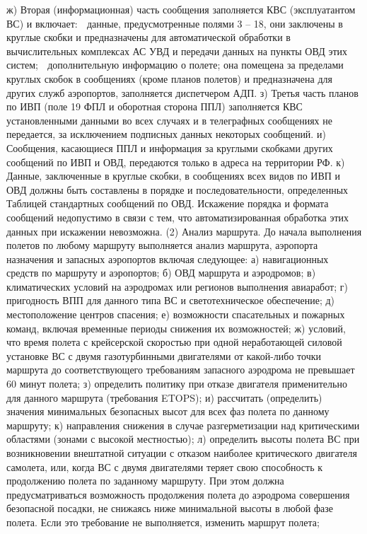 ж)	Вторая (информационная) часть сообщения заполняется КВС (эксплуатантом ВС) и включает:
	данные, предусмотренные полями 3 – 18, они заключены в круглые скобки и предназначены для автоматической обработки в вычислительных комплексах АС УВД и передачи данных на пункты ОВД этих систем;
	дополнительную информацию о полете; она помещена за пределами круглых скобок в сообщениях (кроме планов полетов) и предназначена для других служб аэропортов, заполняется диспетчером АДП.
з)	Третья часть планов по ИВП (поле 19 ФПЛ и оборотная сторона ППЛ) заполняется КВС установленными данными во всех случаях и в телеграфных сообщениях не передается, за исключением подписных данных некоторых сообщений.
и)	Сообщения, касающиеся ППЛ и информация за круглыми скобками других сообщений по ИВП и ОВД, передаются только в адреса на территории РФ.
к)	Данные, заключенные в круглые скобки, в сообщениях всех видов по ИВП и ОВД должны быть составлены в порядке и последовательности, определенных Таблицей стандартных сообщений по ОВД. Искажение порядка и формата сообщений недопустимо в связи с тем, что автоматизированная обработка этих данных при искажении невозможна.
(2) Анализ маршрута.
До начала выполнения полетов по любому маршруту выполняется анализ маршрута, аэропорта назначения и запасных аэропортов включая следующее:
а)	навигационных средств по маршруту и аэропортов;
б)	ОВД маршрута и аэродромов;
в)	климатических условий на аэродромах или регионов выполнения авиаработ;
г)	пригодность ВПП для данного типа ВС и светотехническое обеспечение;
д)	местоположение центров спасения;
е)	возможности спасательных и пожарных команд, включая временные периоды снижения их возможностей; 
ж)	условий, что время полета с крейсерской скоростью при одной неработающей силовой установке ВС с двумя газотурбинными двигателями от какой-либо точки маршрута до соответствующего требованиям запасного аэродрома не превышает 60 минут полета;
з)	определить политику при отказе двигателя применительно для данного маршрута (требования ETOPS); 
и)	рассчитать (определить) значения минимальных безопасных высот для всех фаз полета по данному маршруту;
к)	направления снижения в случае разгерметизации над критическими областями (зонами с высокой местностью);
л)	определить высоты полета ВС при возникновении внештатной ситуации с отказом наиболее критического двигателя самолета, или, когда ВС с двумя двигателями теряет свою способность к продолжению полета по заданному маршруту. При этом должна предусматриваться возможность продолжения полета до аэродрома совершения безопасной посадки, не снижаясь ниже минимальной высоты в любой фазе полета. Если это требование не выполняется, изменить маршрут полета;
